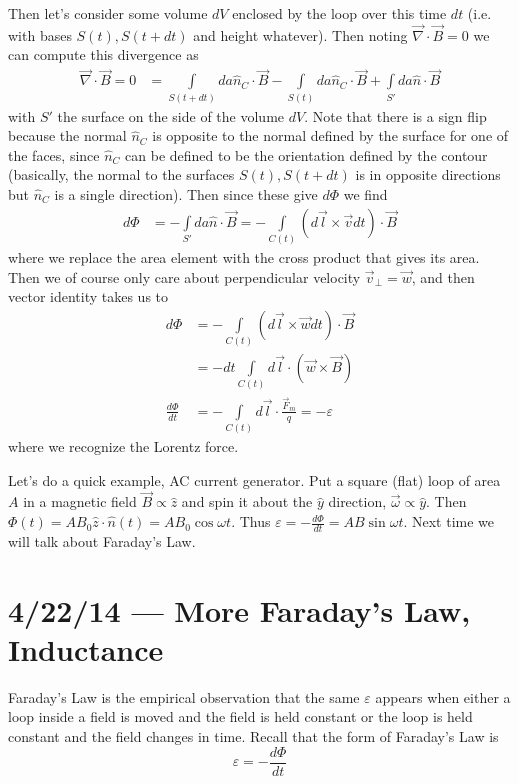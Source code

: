 \documentclass[10pt]{report}
\newcommand{\rd}[2]{\frac{d#1}{d#2}}
\begin{document}
Then let's consider some volume $dV$ enclosed by the loop over this time $dt$ (i.e. with bases $S(t), S(t + dt)$ and height whatever). Then noting $\vec{\nabla}\cdot \vec{B} = 0$ we can compute this divergence as
\begin{align}
    \vec{\nabla}\cdot \vec{B} = 0 &= \int\limits_{S(t + dt)}^{}da \hat{n}_C \cdot \vec{B} - \int\limits_{S(t)}^{}da \hat{n}_C \cdot\vec{B} + \int\limits_{S'}^{}da \hat{n} \cdot \vec{B}
\end{align}
with $S'$ the surface on the side of the volume $dV$. Note that there is a sign flip because the normal $\hat{n}_C$ is opposite to the normal defined by the surface for one of the faces, since $\hat{n}_C$ can be defined to be the orientation defined by the contour (basically, the normal to the surfaces $S(t), S(t + dt)$ is in opposite directions but $\hat{n}_C$ is a single direction). Then since these give $d\Phi$ we find
\begin{align}
    d\Phi &= -\int\limits_{S'}^{}da \hat{n}\cdot \vec{B} = -\int\limits_{C(t)}^{}(d\vec{l} \times \vec{v}dt)\cdot \vec{B}
\end{align}
where we replace the area element with the cross product that gives its area. Then we of course only care about perpendicular velocity $\vec{v}_{\perp} = \vec{w}$, and then vector identity takes us to
\begin{align}
    d\Phi &= -\int\limits_{C(t)}^{}(d\vec{l} \times \vec{w}dt)\cdot \vec{B}\\
    &= -dt \int\limits_{C(t)}^{}d\vec{l} \cdot (\vec{w} \times \vec{B})\\
    \rd{\Phi}{t} &= -\int\limits_{C(t)}^{}d\vec{l} \cdot \frac{\vec{F}_m}{q} = -\varepsilon
\end{align}
where we recognize the Lorentz force. 

Let's do a quick example, AC current generator. Put a square (flat) loop of area $A$ in a magnetic field $\vec{B} \propto \hat{z}$ and spin it about the $\hat{y}$ direction, $\vec{\omega} \propto \hat{y}$. Then $\Phi(t) = AB_0\hat{z} \cdot \hat{n}(t) = AB_0\cos \omega t$. Thus $\varepsilon = -\rd{\Phi}{t} = AB\sin \omega t$. Next time we will talk about Faraday's Law.
\chapter{4/22/14 --- More Faraday's Law, Inductance}

Faraday's Law is the empirical observation that the same $\varepsilon$ appears when either a loop inside a field is moved and the field is held constant or the loop is held constant and the field changes in time. Recall that the form of Faraday's Law is
\begin{equation}
    \varepsilon = -\rd{\Phi}{t}
\end{equation}
\end{document}

